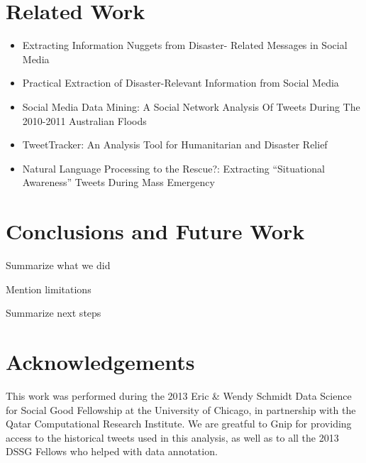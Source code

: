 \documentclass{article}
\begin{document}
\section{Related Work}
\begin{itemize}
\item Extracting Information Nuggets from Disaster- Related Messages in Social Media
\item Practical Extraction of Disaster-Relevant Information from Social Media
\item Social Media Data Mining: A Social Network Analysis Of Tweets During The 2010-2011 Australian Floods
\item TweetTracker: An Analysis Tool for Humanitarian and Disaster Relief
\item Natural Language Processing to the Rescue?: Extracting “Situational Awareness” Tweets During Mass Emergency
\end{itemize}



\section{Conclusions and Future Work}
\begin{outline}
  \item Summarize what we did
  \item Mention limitations
  \item Summarize next steps
\end{outline}

\section{Acknowledgements}
This work was performed during the 2013 Eric \& Wendy Schmidt Data Science for
Social Good Fellowship at the University of Chicago, in partnership with the
Qatar Computational Research Institute. We are greatful to Gnip for providing
access to the historical tweets used in this analysis, as well as to all the
2013 DSSG Fellows who helped with data annotation.



\end{document}
